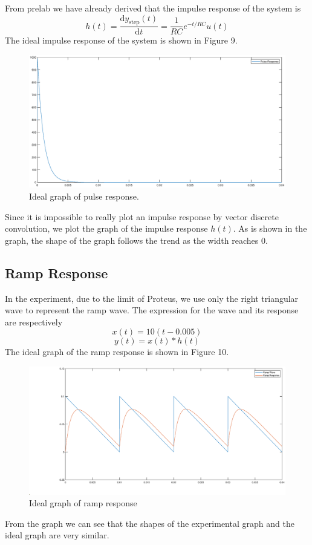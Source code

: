 \documentclass[a4paper]{article}
\begin{document}
From prelab we have already derived that the impulse response of the system is
$$h(t)=\frac{\mathrm{d}y_\text{step}(t)}{\mathrm{d}t}=\frac{1}{RC}e^{-t/RC}u(t)$$
The ideal impulse response of the system is shown in Figure 9.
\begin{figure}[H]
	\centering
	\includegraphics[width=0.8\linewidth]{8.eps}
	\caption{Ideal graph of pulse response.}
\end{figure}
Since it is impossible to really plot an impulse response by vector discrete convolution, we plot the graph of the impulse response $h(t)$. As is shown in the graph, the shape of the graph follows the trend as the width reaches 0.
\subsection{Ramp Response}
In the experiment, due to the limit of Proteus, we use only the right triangular wave to represent the ramp wave. The expression for the wave and its response are respectively
$$x(t)=10(t-0.005)$$
$$y(t)=x(t)*h(t)$$
The ideal graph of the ramp response is shown in Figure 10.
\begin{figure}[H]
	\centering
	\includegraphics[width=0.7\linewidth]{7.eps}
	\caption{Ideal graph of ramp response}
\end{figure}
From the graph we can see that the shapes of the experimental graph and the ideal graph are very similar.
\end{document}
